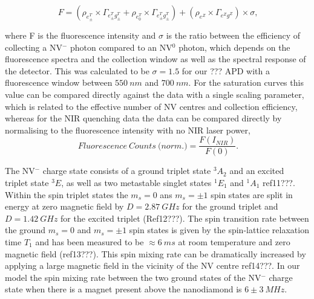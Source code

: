 \documentclass[prl]{revtex4}
\begin{document}
\begin{equation}
\SI{}{F} = \left(\rho_{e^{T}_\pm}\times\Gamma_{e^T_{\pm}g^T_{\pm}} +\rho_{e^{T}_0}\times\Gamma_{e^T_{\pm}g^T_{\pm}}\right)+\left(\rho_{e^Z}\times\Gamma_{e^Zg^Z}\right)\times\sigma,
\label{EqnFluoro}
\end{equation}

where F is the fluorescence intensity and $\sigma$ is the ratio between the efficiency of collecting a NV$^-$ photon compared to an NV$^0$ photon, which depends on the fluorescence spectra and the collection window as well as the spectral response of the detector. This was calculated to be $\sigma=1.5$ for our ??? APD with a fluorescence window between $\SI{550}{nm}$ and $\SI{700}{nm}$. For the saturation curves this value can be compared directly against the data with a single scaling parameter, which is related to the effective number of NV centres and collection efficiency, whereas for the NIR quenching data the data can be compared directly by normalising to the fluorescence intensity with no NIR laser power,
\begin{equation}
\SI{}{Fluorescence\ Counts\ (norm}.) = \frac{F(I_{NIR})}{F(0)}.
\label{EqnFluoroCounts}
\end{equation}


The NV$^-$ charge state consists of a ground triplet state $^3A_2$ and an excited triplet state $^3E$, as well as two metastable singlet states $^1E_1$ and $^1A_1$ ref11???. Within the spin triplet states the $m_s = 0$ ans $m_s = \pm1$ spin states are split in energy at zero magnetic field by $D=\SI{2.87}{GHz}$ for the ground triplet and $D=\SI{1.42}{GHz}$ for the excited triplet (Ref12???). The spin transition rate between the ground $m_s = 0$ and $m_s = \pm1$ spin states is given by the spin-lattice relaxation time $T_1$ and has been measured to be $\approx\SI{6}{ms}$ at room temperature and zero magnetic field (ref13???). This spin mixing rate can be dramatically increased by applying a large magnetic field in the vicinity of the NV centre ref14???. In our model the spin mixing rate between the two ground states of the NV$^-$ charge state when there is a magnet present above the nanodiamond is $6\pm \SI{3}{MHz}$.
\end{document}
